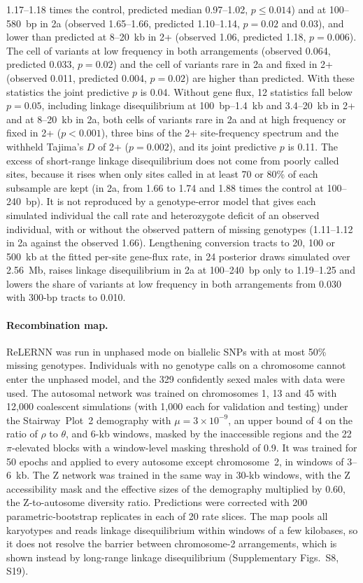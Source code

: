 \documentclass[11pt]{article}
\begin{document}
1.17--1.18 times the control, predicted median 0.97--1.02, $p\le0.014$) and at 100--580~bp in 2a (observed 1.65--1.66, predicted 1.10--1.14, $p=0.02$ and 0.03), and lower than predicted at 8--20~kb in 2+ (observed 1.06, predicted 1.18, $p=0.006$). The cell of variants at low frequency in both arrangements (observed 0.064, predicted 0.033, $p=0.02$) and the cell of variants rare in 2a and fixed in 2+ (observed 0.011, predicted 0.004, $p=0.02$) are higher than predicted. With these statistics the joint predictive $p$ is 0.04. Without gene flux, 12 statistics fall below $p=0.05$, including linkage disequilibrium at 100~bp--1.4~kb and 3.4--20~kb in 2+ and at 8--20~kb in 2a, both cells of variants rare in 2a and at high frequency or fixed in 2+ ($p<0.001$), three bins of the 2+ site-frequency spectrum and the withheld Tajima's $D$ of 2+ ($p=0.002$), and its joint predictive $p$ is 0.11. The excess of short-range linkage disequilibrium does not come from poorly called sites, because it rises when only sites called in at least 70 or 80\% of each subsample are kept (in 2a, from 1.66 to 1.74 and 1.88 times the control at 100--240~bp). It is not reproduced by a genotype-error model that gives each simulated individual the call rate and heterozygote deficit of an observed individual, with or without the observed pattern of missing genotypes (1.11--1.12 in 2a against the observed 1.66). Lengthening conversion tracts to 20, 100 or 500~kb at the fitted per-site gene-flux rate, in 24 posterior draws simulated over 2.56~Mb, raises linkage disequilibrium in 2a at 100--240~bp only to 1.19--1.25 and lowers the share of variants at low frequency in both arrangements from 0.030 with 300-bp tracts to 0.010.

\paragraph{Recombination map.}
ReLERNN \citep{adrion2020relernn} was run in unphased mode on biallelic SNPs with at most 50\% missing genotypes.
Individuals with no genotype calls on a chromosome cannot enter the unphased model, and the 329 confidently sexed males
with data were used. The autosomal network was trained on chromosomes 1, 13 and 45 with
12{,}000 coalescent simulations (with 1{,}000 each for validation and testing) under the Stairway~Plot~2
demography with $\mu=3\times10^{-9}$, an upper bound of 4 on the ratio of $\rho$ to $\theta$, and 6-kb windows,
masked by the inaccessible regions and the 22 $\pi$-elevated blocks with a window-level masking threshold of 0.9.
It was trained for 50 epochs and applied to every autosome except chromosome~2, in windows of 3--6~kb. The Z
network was trained in the same way in 30-kb windows, with the Z accessibility mask and the effective sizes of the
demography multiplied by 0.60, the Z-to-autosome diversity ratio. Predictions were corrected with 200
parametric-bootstrap replicates in each of 20 rate slices. The map pools all karyotypes and reads linkage
disequilibrium within windows of a few kilobases, so it does not resolve the barrier between chromosome-2 arrangements, which is shown instead by long-range linkage
disequilibrium (Supplementary Figs.~S8, S19).
\end{document}
